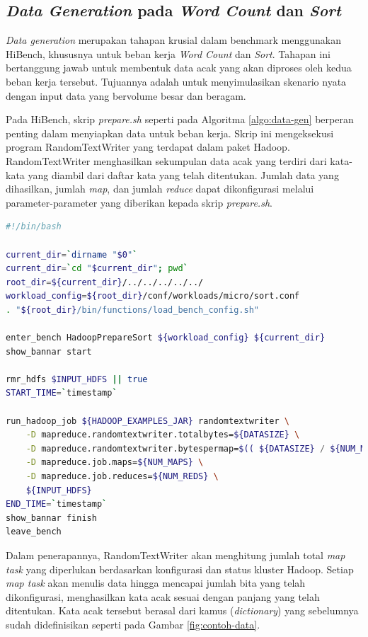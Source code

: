 \subsection{\textit{Data Generation} pada \textit{Word Count} dan \textit{Sort}}
\textit{Data generation} merupakan tahapan krusial dalam benchmark menggunakan HiBench, khususnya untuk beban kerja \textit{Word Count} dan \textit{Sort}. Tahapan ini bertanggung jawab untuk membentuk data acak yang akan diproses oleh kedua beban kerja tersebut. Tujuannya adalah untuk menyimulasikan skenario nyata dengan input data yang bervolume besar dan beragam.

Pada HiBench, skrip \textit{prepare.sh} seperti pada Algoritma \ref{algo:data-gen} berperan penting dalam menyiapkan data untuk beban kerja. Skrip ini mengeksekusi program RandomTextWriter yang terdapat dalam paket Hadoop. RandomTextWriter menghasilkan sekumpulan data acak yang terdiri dari kata-kata yang diambil dari daftar kata yang telah ditentukan. Jumlah data yang dihasilkan, jumlah \textit{map}, dan jumlah \textit{reduce} dapat dikonfigurasi melalui parameter-parameter yang diberikan kepada skrip \textit{prepare.sh}.

\begin{lstlisting}[language=bash, caption=Skrip yang Digunakan HiBench pada Tahap \textit{Data Generation}, label=algo:data-gen]
#!/bin/bash

current_dir=`dirname "$0"`
current_dir=`cd "$current_dir"; pwd`
root_dir=${current_dir}/../../../../../
workload_config=${root_dir}/conf/workloads/micro/sort.conf
. "${root_dir}/bin/functions/load_bench_config.sh"

enter_bench HadoopPrepareSort ${workload_config} ${current_dir}
show_bannar start

rmr_hdfs $INPUT_HDFS || true
START_TIME=`timestamp`

run_hadoop_job ${HADOOP_EXAMPLES_JAR} randomtextwriter \
    -D mapreduce.randomtextwriter.totalbytes=${DATASIZE} \
    -D mapreduce.randomtextwriter.bytespermap=$(( ${DATASIZE} / ${NUM_MAPS} )) \
    -D mapreduce.job.maps=${NUM_MAPS} \
    -D mapreduce.job.reduces=${NUM_REDS} \
    ${INPUT_HDFS}
END_TIME=`timestamp`
show_bannar finish
leave_bench
\end{lstlisting}

Dalam penerapannya, RandomTextWriter akan menghitung jumlah total \textit{map task} yang diperlukan berdasarkan konfigurasi dan status kluster Hadoop. Setiap \textit{map task} akan menulis data hingga mencapai jumlah bita yang telah dikonfigurasi, menghasilkan kata acak sesuai dengan panjang yang telah ditentukan. Kata acak tersebut berasal dari kamus (\textit{dictionary}) yang sebelumnya sudah didefinisikan seperti pada Gambar \ref{fig:contoh-data}.


